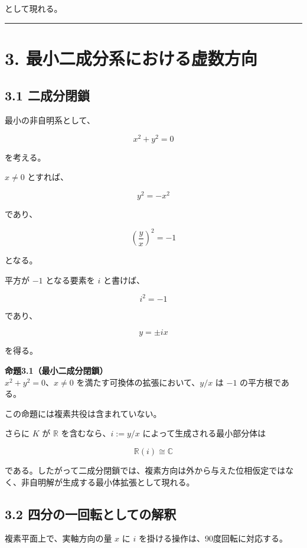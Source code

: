 \documentclass[
  a4paper,
  10pt]{article}
\begin{document}
として現れる。

\begin{center}\rule{0.5\linewidth}{0.5pt}\end{center}

\section{3.
最小二成分系における虚数方向}\label{3-ux6700ux5c0fux4e8cux6210ux5206ux7cfbux306bux304aux3051ux308bux865aux6570ux65b9ux5411}

\subsection{3.1 二成分閉鎖}\label{31-ux4e8cux6210ux5206ux9589ux9396}

最小の非自明系として、

\[
x^2+y^2=0
\]

を考える。

\(x\neq0\) とすれば、

\[
y^2=-x^2
\]

であり、

\[
\left(\frac{y}{x}\right)^2=-1
\]

となる。

平方が \(-1\) となる要素を \(i\) と書けば、

\[
i^2=-1
\]

であり、

\[
\boxed{
y=\pm ix
}
\]

を得る。

\textbf{命題3.1（最小二成分閉鎖）}\\
\(x^2+y^2=0\)、\(x\neq0\) を満たす可換体の拡張において、\(y/x\) は
\(-1\) の平方根である。

この命題には複素共役は含まれていない。

さらに \(K\) が \(\mathbb R\) を含むなら、\(i:=y/x\)
によって生成される最小部分体は

\[
\mathbb R(i)\cong\mathbb C
\]

である。したがって二成分閉鎖では、複素方向は外から与えた位相仮定ではなく、非自明解が生成する最小体拡張として現れる。

\subsection{3.2
四分の一回転としての解釈}\label{32-ux56dbux5206ux306eux4e00ux56deux8ee2ux3068ux3057ux3066ux306eux89e3ux91c8}

複素平面上で、実軸方向の量 \(x\) に \(i\)
を掛ける操作は、90度回転に対応する。
\end{document}
